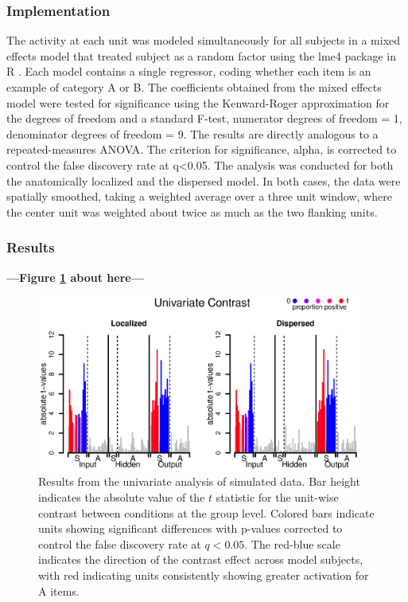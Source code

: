 \subsubsection{Implementation}
The activity at each unit was modeled simultaneously for all subjects in a mixed effects model that treated subject as a random factor \cite{chen_linear_2013, friston_mixed-effects_2005} using the lme4 package in R \cite{bates_linear_2013}. Each model contains a single regressor, coding whether each item is an example of category A or B. The coefficients obtained from the mixed effects model were tested for significance using the Kenward-Roger approximation for the degrees of freedom \cite{kenward_small_1997} and a standard F-test, numerator degrees of freedom = 1, denominator degrees of freedom = 9. The results are directly analogous to a repeated-measures ANOVA. The criterion for significance, alpha, is corrected to control the false discovery rate at q<0.05. The analysis was conducted for both the anatomically localized and the dispersed model. In both cases, the data were spatially smoothed, taking a weighted average over a three unit window, where the center unit was weighted about twice as much as the two flanking units.

\subsubsection{Results} 

\begin{center}
\textbf{---Figure \ref{fig.univariate} about here---}
\end{center}

\begin{figure}
\centering
\includegraphics[width=0.95\textwidth]{figures/figure4.eps}
\caption{Results from the univariate analysis of simulated data. Bar height indicates the absolute value of the $t$ statistic for the unit-wise contrast between conditions at the group level. Colored bars indicate units showing significant differences with p-values corrected to control the false discovery rate at $q<0.05$. The red-blue scale indicates the direction of the contrast effect across model subjects, with red indicating units consistently showing greater activation for A items.}
\label{fig.univariate} 
\end{figure}

